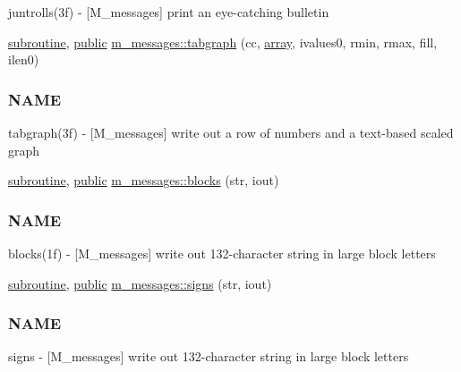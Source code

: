 \begin{DoxyCompactItemize}
\begin{DoxyCompactList}
juntrolls(3f) -\/ \mbox{[}M\+\_\+messages\mbox{]} print an eye-\/catching bulletin \end{DoxyCompactList}\item 
\hyperlink{M__stopwatch_83_8txt_acfbcff50169d691ff02d4a123ed70482}{subroutine}, \hyperlink{M__stopwatch_83_8txt_a2f74811300c361e53b430611a7d1769f}{public} \hyperlink{namespacem__messages_acc516fb8a4dd9eede3abb535ff7496e0}{m\+\_\+messages\+::tabgraph} (cc, \hyperlink{intro__blas1_83_8txt_a89db1945e1a335ab0184c6a097821e32}{array}, ivalues0, rmin, rmax, fill, ilen0)
\begin{DoxyCompactList}\small\item\em \subsubsection*{N\+A\+ME}

tabgraph(3f) -\/ \mbox{[}M\+\_\+messages\mbox{]} write out a row of numbers and a text-\/based scaled graph \end{DoxyCompactList}\item 
\hyperlink{M__stopwatch_83_8txt_acfbcff50169d691ff02d4a123ed70482}{subroutine}, \hyperlink{M__stopwatch_83_8txt_a2f74811300c361e53b430611a7d1769f}{public} \hyperlink{namespacem__messages_a91d3a2ecf1ca4868fdd9f18720a13136}{m\+\_\+messages\+::blocks} (str, iout)
\begin{DoxyCompactList}\small\item\em \subsubsection*{N\+A\+ME}

blocks(1f) -\/ \mbox{[}M\+\_\+messages\mbox{]} write out 132-\/character string in large block letters \end{DoxyCompactList}\item 
\hyperlink{M__stopwatch_83_8txt_acfbcff50169d691ff02d4a123ed70482}{subroutine}, \hyperlink{M__stopwatch_83_8txt_a2f74811300c361e53b430611a7d1769f}{public} \hyperlink{namespacem__messages_a239cb1269cc27d45176b9a278276d399}{m\+\_\+messages\+::signs} (str, iout)
\begin{DoxyCompactList}\small\item\em \subsubsection*{N\+A\+ME}

signs -\/ \mbox{[}M\+\_\+messages\mbox{]} write out 132-\/character string in large block letters \end{DoxyCompactList}\end{DoxyCompactItemize}
